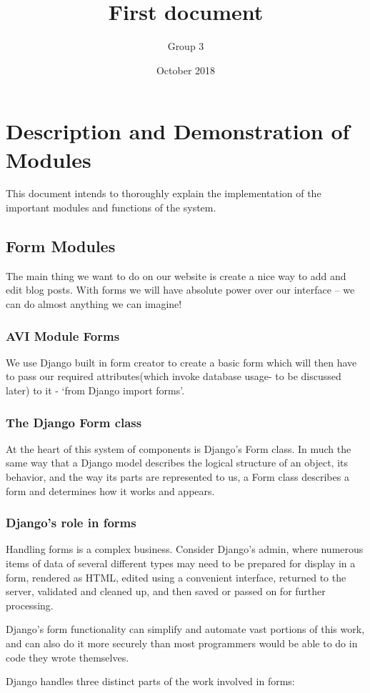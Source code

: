 \documentclass[10pt]{article}
\title{First document}
\author{Group 3}
\date{October 2018}
\begin{document}
\section{Description and Demonstration of Modules}
This document intends to thoroughly explain the implementation of the important modules and functions of the system.

\subsection{Form Modules}
The main thing we want to do on our website is create a nice way to add and edit blog posts. With forms we will have absolute power over our interface – we can do almost anything we can imagine!

\subsubsection{AVI Module Forms}
We use Django built in form creator to create a basic form which will then have to pass our required attributes(which invoke database usage- to be discussed later) to it - ‘from Django import forms’.

\subsubsection{The Django Form class}
At the heart of this system of components is Django’s Form class. In much the same way that a Django model describes the logical structure of an object, its behavior, and the way its parts are represented to us, a Form class describes a form and determines how it works and appears.

\subsubsection{Django’s role in forms}

Handling forms is a complex business. Consider Django’s admin, where numerous items of data of several different types may need to be prepared for display in a form, rendered as HTML, edited using a convenient interface, returned to the server, validated and cleaned up, and then saved or passed on for further processing.

Django’s form functionality can simplify and automate vast portions of this work, and can also do it more securely than most programmers would be able to do in code they wrote themselves.

Django handles three distinct parts of the work involved in forms:
\end{document}
